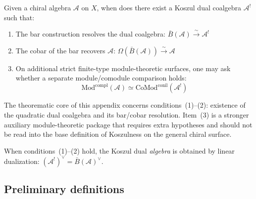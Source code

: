 \begin{question}\label{q:existence-central}
Given a chiral algebra $\mathcal{A}$ on $X$, when does there exist a
Koszul dual coalgebra $\mathcal{A}^!$ such that:
\begin{enumerate}
\item The bar construction resolves the dual coalgebra:
      $\bar{B}(\mathcal{A}) \xrightarrow{\sim} \mathcal{A}^!$
\item The cobar of the bar recovers $\mathcal{A}$:
      $\Omega(\bar{B}(\mathcal{A})) \xrightarrow{\sim} \mathcal{A}$
\item On additional strict finite-type module-theoretic surfaces, one
      may ask whether a separate module/comodule comparison holds:
      \[\mathrm{Mod}^{\mathrm{compl}}(\mathcal{A}) \simeq
      \mathrm{CoMod}^{\mathrm{conil}}(\mathcal{A}^!)\]
\end{enumerate}
The theorematic core of this appendix concerns conditions~(1)--(2):
existence of the quadratic dual coalgebra and its bar/cobar
resolution.  Item~(3) is a stronger auxiliary module-theoretic package
that requires extra hypotheses and should not be read into the base
definition of Koszulness on the general chiral surface.

When conditions~(1)--(2) hold, the Koszul dual \emph{algebra} is
obtained by linear dualization:
$(\mathcal{A}^!)^{\vee} = \bar{B}(\mathcal{A})^{\vee}$.
\end{question}

\subsection{Preliminary definitions}

